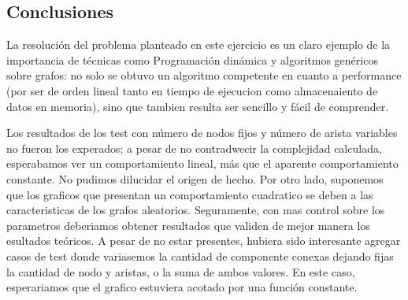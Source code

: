 
%



\subsection{Conclusiones}

La resoluci\'on del problema planteado en este ejercicio es un claro ejemplo de la importancia de t\'ecnicas como Programaci\'on din\'amica y algoritmos gen\'ericos sobre grafos: no solo se obtuvo un algoritmo competente en cuanto a performance (por ser de orden lineal tanto en tiempo de ejecucion como almacenaiento de datos en memoria), sino que tambien resulta ser sencillo y f\'acil de comprender.

Los resultados de los test con n\'umero de nodos fijos y n\'umero de arista variables no fueron los experados; a pesar de no contradwecir la complejidad calculada, esperabamos ver un comportamiento lineal, m\'as que el aparente comportamiento constante. No pudimos dilucidar el origen de hecho. Por otro lado, suponemos que los graficos que presentan un comportamiento cuadratico se deben a las caracteristicas de los grafos aleatorios. Seguramente, con mas control sobre los parametros deberiamos obtener resultados que validen de mejor manera los esultados te\'oricos.
A pesar de no estar presentes, hubiera sido interesante agregar casos de test donde variasemos la cantidad de componente conexas dejando fijas la cantidad de nodo y aristas, o la suma de ambos valores. En este caso, esperariamos que el grafico estuviera acotado por una funci\'on constante.

